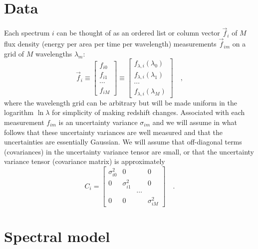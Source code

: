 \documentclass[12pt]{article}
\newcommand{\fluxvec}{\vec{f}}
\begin{document}
\section{Data}

Each spectrum $i$ can be thought of as an ordered list or column
vector $\fluxvec_i$ of $M$ flux density (energy per area per time per
wavelength) measurements $\fluxvec_{im}$ on a grid of $M$
wavelengths $\lambda_m$:
\begin{equation}
\fluxvec_i
\equiv \left[\begin{array}{c} f_{i0} \\
                              f_{i1} \\
                              \cdots \\
                              f_{iM} \end{array}\right]
\equiv \left[\begin{array}{c} f_{\lambda,i}(\lambda_0) \\
                              f_{\lambda,i}(\lambda_1) \\
                                                \cdots \\
                              f_{\lambda,i}(\lambda_M) \end{array}\right]
\quad ,
\end{equation}
where the wavelength grid can be arbitrary but will be made uniform in
the logarithm $\ln\lambda$ for simplicity of making redshift changes.
Associated with each measurement $f_{im}$ is an uncertainty
variance $\sigma_{im}$ and we will assume in what follows that
these uncertainty variances are well measured and that the
uncertainties are essentially Gaussian.  We will assume that
off-diagonal terms (covariances) in the uncertainty variance tensor
are small, or that the uncertainty variance tensor (covariance matrix)
is approximately
\begin{equation}
C_i = \left[\begin{array}{cccc} \sigma_{i0}^2 & 0 & & 0 \\
                                0 & \sigma_{i1}^2 & & 0 \\
                                & & \cdots & \\
                                0 & 0 & & \sigma_{iM}^2 \end{array}\right]
\quad .
\end{equation}

\section{Spectral model}
\end{document}
